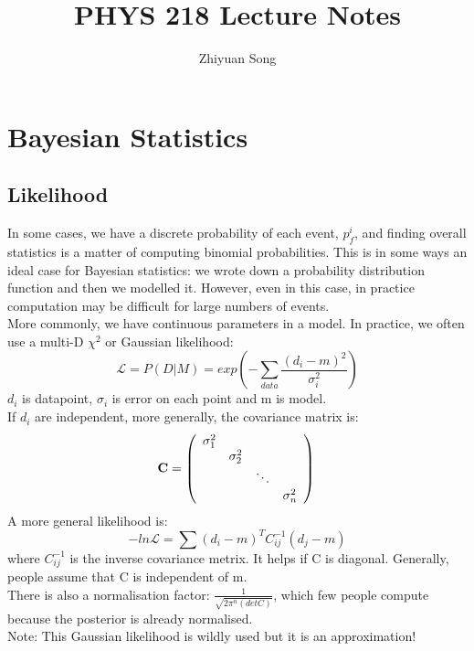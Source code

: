 \documentclass[12pt]{article}
\begin{document}
\title{PHYS 218 Lecture Notes}
\author{Zhiyuan Song}
\maketitle

\section{Bayesian Statistics}
\subsection{Likelihood}
In some cases, we have a discrete probability of each event, $p^i_f$, and finding overall statistics is a matter of computing binomial probabilities. This is in some ways an ideal case for Bayesian statistics: we wrote down a probability distribution function and then we modelled it. However, even in this case, in practice computation may be difficult for large numbers of events.\\
More commonly, we have continuous parameters in a model. In practice, we often use a multi-D $\chi^2$ or Gaussian likelihood:
\begin{equation}
	\mathcal{L} = P(D|M) = exp(-\sum_{data}\frac{(d_i-m)^2}{\sigma_i^2})
\end{equation}
$d_i$ is datapoint, $\sigma_i$ is error on each point and m is model.\\
If $d_i$ are independent, more generally, the covariance matrix is:
\begin{displaymath}
\mathbf{C} =
\left( \begin{array}{cccc} \sigma_1^2 & \\
& \sigma^2_2 & &\\
& & \ddots & \\
& & & \sigma^2_n
\end{array} \right) \\
\end{displaymath}
A more general likelihood is:
\begin{equation}
	-ln\mathcal{L} = \sum (d_i - m)^T C_{ij}^{-1} (d_j -m)
\end{equation}
where $C_{ij}^{-1}$ is the inverse covariance metrix. It helps if C is diagonal. Generally, people assume that C is independent of m.\\
There is also a normalisation factor: $\frac{1}{\sqrt{2\pi^n (det C)}}$, which few people compute because the posterior is already normalised.\\
Note: This Gaussian likelihood is wildly used but it is an approximation!
\end{document}
